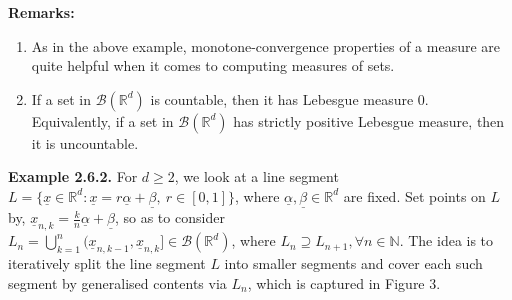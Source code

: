\documentclass{article}
\begin{document}
\textbf{Remarks:}
\begin{enumerate}
	\item As in the above example, monotone-convergence properties of a measure are quite helpful when it comes to computing measures of sets.
	\item If a set in $\mathcal{B}(\mathbb{R}^d)$ is countable, then it has Lebesgue measure $0$. Equivalently, if a set in $\mathcal{B}(\mathbb{R}^d)$ has strictly positive Lebesgue measure, then it is uncountable. 
\end{enumerate}
\textbf{Example 2.6.2.} For $d \geq 2$, we look at a line segment $L = \{\underline{x} \in \mathbb{R}^d: \underline{x} = r\underline{\alpha} + \underline{\beta}, \ r \in [0,1]\}$, where $\underline{\alpha}, \underline{\beta} \in \mathbb{R}^d$ are fixed. Set points on $L$ by, $\underline{x}_{n,k} = \frac{k}{n}\underline{\alpha} + \underline{\beta}$, so as to consider \\$L_{n} = \bigcup_{k=1}^{n}(\underline{x}_{n,k-1}, \underline{x}_{n,k}] \in \mathcal{B}(\mathbb{R}^d)$, where $L_{n} \supseteq L_{n+1}, \forall n \in \mathbb{N}$. The idea is to iteratively split the line segment $L$ into smaller segments and cover each such segment by generalised contents via $L_n$, which is captured in Figure 3.\\
\end{document}
